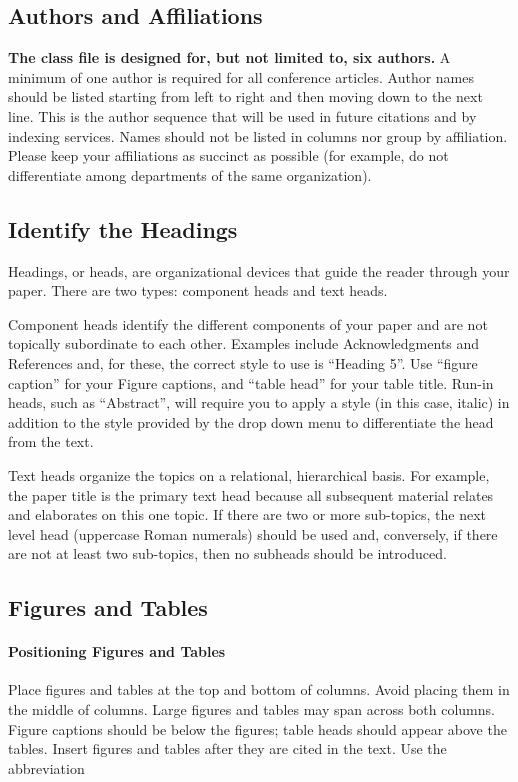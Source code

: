 \documentclass[conference]{IEEEtran}
\begin{document}
\subsection{Authors and Affiliations}
\textbf{The class file is designed for, but not limited to, six authors.} A 
minimum of one author is required for all conference articles. Author names 
should be listed starting from left to right and then moving down to the 
next line. This is the author sequence that will be used in future citations 
and by indexing services. Names should not be listed in columns nor group by 
affiliation. Please keep your affiliations as succinct as possible (for 
example, do not differentiate among departments of the same organization).

\subsection{Identify the Headings}
Headings, or heads, are organizational devices that guide the reader through 
your paper. There are two types: component heads and text heads.

Component heads identify the different components of your paper and are not 
topically subordinate to each other. Examples include Acknowledgments and 
References and, for these, the correct style to use is ``Heading 5''. Use 
``figure caption'' for your Figure captions, and ``table head'' for your 
table title. Run-in heads, such as ``Abstract'', will require you to apply a 
style (in this case, italic) in addition to the style provided by the drop 
down menu to differentiate the head from the text.

Text heads organize the topics on a relational, hierarchical basis. For 
example, the paper title is the primary text head because all subsequent 
material relates and elaborates on this one topic. If there are two or more 
sub-topics, the next level head (uppercase Roman numerals) should be used 
and, conversely, if there are not at least two sub-topics, then no subheads 
should be introduced.

\subsection{Figures and Tables}
\paragraph{Positioning Figures and Tables} Place figures and tables at the top and 
bottom of columns. Avoid placing them in the middle of columns. Large 
figures and tables may span across both columns. Figure captions should be 
below the figures; table heads should appear above the tables. Insert 
figures and tables after they are cited in the text. Use the abbreviation 
\end{document}
